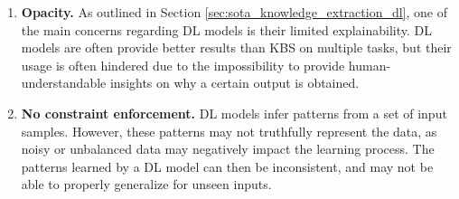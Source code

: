 \begin{enumerate} [start=1,label={\bfseries L\arabic*.}]
    \item \label{kbsintrodl_L_opacity} \textbf{Opacity.} As outlined in Section \ref{sec:sota_knowledge_extraction_dl}, one of the main concerns regarding DL models is their limited explainability. DL models are often provide better results than KBS on multiple tasks, but their usage is often hindered due to the impossibility to provide human-understandable insights on why a certain output is obtained.
    
    \item \label{kbsintrodl_L_constraint} \textbf{No constraint enforcement.} DL models infer patterns from a set of input samples. However, these patterns may not truthfully represent the data, as noisy or unbalanced data may negatively impact the learning process. The patterns learned by a DL model can then be inconsistent, and may not be able to properly generalize for unseen inputs.
    \end{enumerate}
